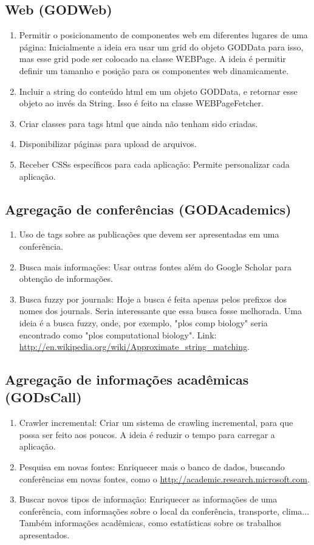\subsection{Web (GODWeb)}
\begin{enumerate}
\item Permitir o posicionamento de componentes web em diferentes lugares de uma página: Inicialmente a ideia era usar um grid do objeto GODData para isso, mas esse grid pode ser colocado na classe WEBPage. A ideia é permitir definir um tamanho e posição para os componentes web dinamicamente.
\item Incluir a string do conteúdo html em um objeto GODData, e retornar esse objeto ao invés da String. Isso é feito na classe WEBPageFetcher.
\item Criar classes para tags html que ainda não tenham sido criadas.
\item Disponibilizar páginas para upload de arquivos.
\item Receber CSSs específicos para cada aplicação: Permite personalizar cada aplicação.
\end{enumerate}

\subsection{Agregação de conferências (GODAcademics)}
\begin{enumerate}
\item Uso de tags sobre as publicações que devem ser apresentadas em uma conferência.
\item Busca mais informações: Usar outras fontes além do Google Scholar para obtenção de informações.
\item Busca fuzzy por journals: Hoje a busca é feita apenas pelos prefixos dos nomes dos journals. Seria interessante que essa busca fosse melhorada. Uma ideia é a busca fuzzy, onde, por exemplo, "plos comp biology" seria encontrado como "plos computational biology". Link: \url{http://en.wikipedia.org/wiki/Approximate_string_matching}.
\end{enumerate}

\subsection{Agregação de informações acadêmicas (GODsCall)}
\begin{enumerate}
\item Crawler incremental: Criar um sistema de crawling incremental, para que possa ser feito aos poucos. A ideia é reduzir o tempo para carregar a aplicação.
\item Pesquisa em novas fontes: Enriquecer mais o banco de dados, buscando conferências em novas fontes, como o \url{http://academic.research.microsoft.com}.
\item Buscar novos tipos de informação: Enriquecer as informações de uma conferência, com informações sobre o local da conferência, transporte, clima... Também informações acadêmicas, como estatísticas sobre os trabalhos apresentados.
\end{enumerate}

